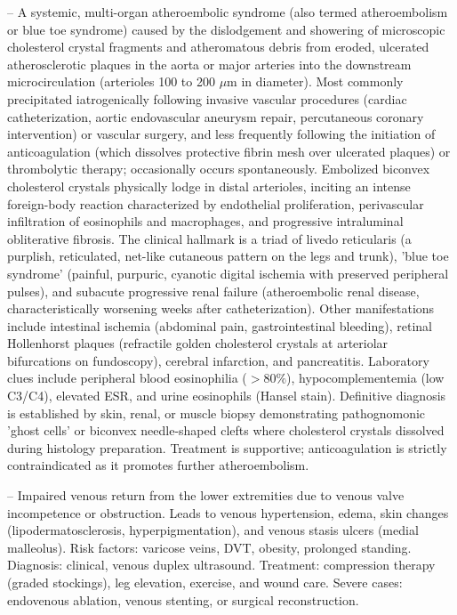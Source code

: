 -- A systemic, multi-organ atheroembolic syndrome (also termed atheroembolism or blue toe syndrome) caused by the dislodgement and showering of microscopic cholesterol crystal fragments and atheromatous debris from eroded, ulcerated atherosclerotic plaques in the aorta or major arteries into the downstream microcirculation (arterioles 100 to 200 $\mu$m in diameter). Most commonly precipitated iatrogenically following invasive vascular procedures (cardiac catheterization, aortic endovascular aneurysm repair, percutaneous coronary intervention) or vascular surgery, and less frequently following the initiation of anticoagulation (which dissolves protective fibrin mesh over ulcerated plaques) or thrombolytic therapy; occasionally occurs spontaneously. Embolized biconvex cholesterol crystals physically lodge in distal arterioles, inciting an intense foreign-body reaction characterized by endothelial proliferation, perivascular infiltration of eosinophils and macrophages, and progressive intraluminal obliterative fibrosis. The clinical hallmark is a triad of livedo reticularis (a purplish, reticulated, net-like cutaneous pattern on the legs and trunk), 'blue toe syndrome' (painful, purpuric, cyanotic digital ischemia with preserved peripheral pulses), and subacute progressive renal failure (atheroembolic renal disease, characteristically worsening weeks after catheterization). Other manifestations include intestinal ischemia (abdominal pain, gastrointestinal bleeding), retinal Hollenhorst plaques (refractile golden cholesterol crystals at arteriolar bifurcations on fundoscopy), cerebral infarction, and pancreatitis. Laboratory clues include peripheral blood eosinophilia ($>80\%$), hypocomplementemia (low C3/C4), elevated ESR, and urine eosinophils (Hansel stain). Definitive diagnosis is established by skin, renal, or muscle biopsy demonstrating pathognomonic 'ghost cells' or biconvex needle-shaped clefts where cholesterol crystals dissolved during histology preparation. Treatment is supportive; anticoagulation is strictly contraindicated as it promotes further atheroembolism.

-- Impaired venous return from the lower extremities due to venous valve incompetence or obstruction. Leads to venous hypertension, edema, skin changes (lipodermatosclerosis, hyperpigmentation), and venous stasis ulcers (medial malleolus). Risk factors: varicose veins, DVT, obesity, prolonged standing. Diagnosis: clinical, venous duplex ultrasound. Treatment: compression therapy (graded stockings), leg elevation, exercise, and wound care. Severe cases: endovenous ablation, venous stenting, or surgical reconstruction.

